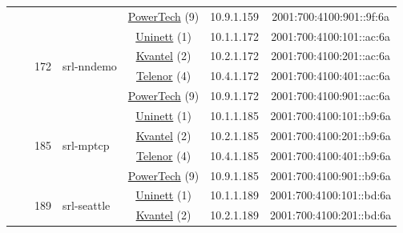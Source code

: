 \begin{small}
\begin{center}
\begin{longtable}{|c|c|c|c|c|c|c|c|}
  &  &  &  & \multicolumn{2}{|c|}{\tiny{\href{http://www.powertech.no}{PowerTech} (9)}} & \tiny{10.9.1.159} & \tiny{2001:700:4100:901::9f:6a} \\* \cline{3-3}\cline{4-4}\cline{5-5}\cline{6-6}\cline{7-7}\cline{8-8}
  &  & \multirow{4}{*}{\tiny{172}} & \multicolumn{1}{|l|}{\multirow{4}{*}{\tiny{srl-nndemo}}} & \multicolumn{2}{|c|}{\tiny{\href{https://www.uninett.no}{Uninett} (1)}} & \tiny{10.1.1.172} & \tiny{2001:700:4100:101::ac:6a} \\* \cline{5-5}\cline{6-6}\cline{7-7}\cline{8-8}
  &  &  &  & \multicolumn{2}{|c|}{\tiny{\href{http://kvantel.no}{Kvantel} (2)}} & \tiny{10.2.1.172} & \tiny{2001:700:4100:201::ac:6a} \\* \cline{5-5}\cline{6-6}\cline{7-7}\cline{8-8}
  &  &  &  & \multicolumn{2}{|c|}{\tiny{\href{https://www.telenor.no}{Telenor} (4)}} & \tiny{10.4.1.172} & \tiny{2001:700:4100:401::ac:6a} \\* \cline{5-5}\cline{6-6}\cline{7-7}\cline{8-8}
  &  &  &  & \multicolumn{2}{|c|}{\tiny{\href{http://www.powertech.no}{PowerTech} (9)}} & \tiny{10.9.1.172} & \tiny{2001:700:4100:901::ac:6a} \\* \cline{3-3}\cline{4-4}\cline{5-5}\cline{6-6}\cline{7-7}\cline{8-8}
  &  & \multirow{4}{*}{\tiny{185}} & \multicolumn{1}{|l|}{\multirow{4}{*}{\tiny{srl-mptcp}}} & \multicolumn{2}{|c|}{\tiny{\href{https://www.uninett.no}{Uninett} (1)}} & \tiny{10.1.1.185} & \tiny{2001:700:4100:101::b9:6a} \\* \cline{5-5}\cline{6-6}\cline{7-7}\cline{8-8}
  &  &  &  & \multicolumn{2}{|c|}{\tiny{\href{http://kvantel.no}{Kvantel} (2)}} & \tiny{10.2.1.185} & \tiny{2001:700:4100:201::b9:6a} \\* \cline{5-5}\cline{6-6}\cline{7-7}\cline{8-8}
  &  &  &  & \multicolumn{2}{|c|}{\tiny{\href{https://www.telenor.no}{Telenor} (4)}} & \tiny{10.4.1.185} & \tiny{2001:700:4100:401::b9:6a} \\* \cline{5-5}\cline{6-6}\cline{7-7}\cline{8-8}
  &  &  &  & \multicolumn{2}{|c|}{\tiny{\href{http://www.powertech.no}{PowerTech} (9)}} & \tiny{10.9.1.185} & \tiny{2001:700:4100:901::b9:6a} \\* \cline{3-3}\cline{4-4}\cline{5-5}\cline{6-6}\cline{7-7}\cline{8-8}
  &  & \multirow{4}{*}{\tiny{189}} & \multicolumn{1}{|l|}{\multirow{4}{*}{\tiny{srl-seattle}}} & \multicolumn{2}{|c|}{\tiny{\href{https://www.uninett.no}{Uninett} (1)}} & \tiny{10.1.1.189} & \tiny{2001:700:4100:101::bd:6a} \\* \cline{5-5}\cline{6-6}\cline{7-7}\cline{8-8}
  &  &  &  & \multicolumn{2}{|c|}{\tiny{\href{http://kvantel.no}{Kvantel} (2)}} & \tiny{10.2.1.189} & \tiny{2001:700:4100:201::bd:6a} \\* \cline{5-5}\cline{6-6}\cline{7-7}\cline{8-8}

\end{longtable}
\end{center}
\end{small}
